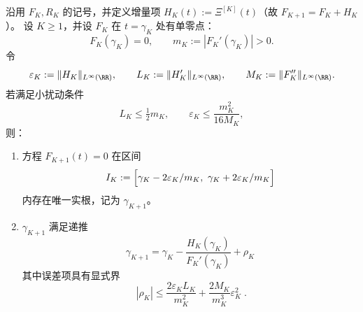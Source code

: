 \begin{theorem}[二幂尺度零点递推与二次型误差项]\label{thm:xi-theta-kernel-dyadic-zero-recursion}
沿用 \(F_K,R_K\) 的记号，并定义增量项 \(H_K(t):=\Xi^{[K]}(t)\)（故 \(F_{K+1}=F_K+H_K\)）。
设 \(K\ge 1\)，并设 \(F_K\) 在 \(t=\gamma_K\) 处有单零点：
\[
F_K(\gamma_K)=0,\qquad m_K:=|F_K'(\gamma_K)|>0.
\]
令
\[
\varepsilon_K:=\|H_K\|_{L^\infty(\RR)},\qquad
L_K:=\|H_K'\|_{L^\infty(\RR)},\qquad
M_K:=\|F_K''\|_{L^\infty(\RR)}.
\]
若满足小扰动条件
\begin{equation}\label{eq:xi-theta-kernel-dyadic-zero-recursion-smallness}
L_K\le \tfrac12 m_K,\qquad
\varepsilon_K\le \frac{m_K^2}{16M_K},
\end{equation}
则：
\begin{enumerate}
  \item 方程 \(F_{K+1}(t)=0\) 在区间
  \begin{equation}\label{eq:xi-theta-kernel-dyadic-zero-recursion-interval}
  I_K:=\Bigl[\gamma_K-2\varepsilon_K/m_K,\ \gamma_K+2\varepsilon_K/m_K\Bigr]
  \end{equation}
  内存在唯一实根，记为 \(\gamma_{K+1}\)。
  \item \(\gamma_{K+1}\) 满足递推
  \begin{equation}\label{eq:xi-theta-kernel-dyadic-zero-recursion-main}
  \boxed{\;
  \gamma_{K+1}
  =\gamma_K-\frac{H_K(\gamma_K)}{F_K'(\gamma_K)}+\rho_K\;}
  \end{equation}
  其中误差项具有显式界
  \begin{equation}\label{eq:xi-theta-kernel-dyadic-zero-recursion-error}
  \boxed{\;
  |\rho_K|
  \le
  \frac{2\varepsilon_K L_K}{m_K^2}
  +\frac{2M_K}{m_K^3}\varepsilon_K^2\; }.
  \end{equation}
\end{enumerate}
\end{theorem}
